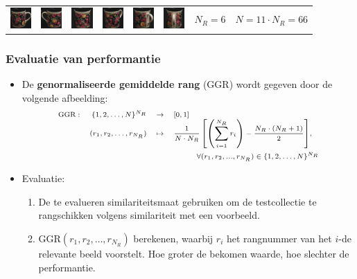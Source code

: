 \documentclass[dutch]{beamer}
\theoremstyle{definition}
\theoremstyle{remark}
\theoremstyle{example}
\begin{document}
{\begin{center}
\begin{tabular}{c@{\ }c@{}c@{}c@{}c@{}c c@{\ }c@{}c@{}c@{}c@{}c}
\includegraphics[width=0.8cm]{coil/beeld-60.eps} &
\includegraphics[width=0.8cm]{coil/beeld-61.eps} &
\includegraphics[width=0.8cm]{coil/beeld-62.eps} &
\includegraphics[width=0.8cm]{coil/beeld-63.eps} &
\includegraphics[width=0.8cm]{coil/beeld-64.eps} &
\includegraphics[width=0.8cm]{coil/beeld-65.eps} &
\multicolumn{2}{c}{$N_R = 6$} & 
\multicolumn{4}{c}{$N = 11 \cdot N_R = 66$}

\end{tabular}
\end{center}

}
\frame
{
  \frametitle{Evaluatie van performantie}

  \begin{itemize}
  \item De \textbf{genormaliseerde gemiddelde rang} (GGR) wordt gegeven door de volgende afbeelding:
  \begin{displaymath}
  \scriptsize\begin{array}{lrcl}
  \text{GGR}: & \{1,2,\ldots,N\}^{N_R} & \to 	& [0,1] \\
		& (r_1,r_2,\ldots,r_{N_R}) & \mapsto &
	{\displaystyle\frac{1}{N \cdot N_R}\left[ \left(\sum_{i=1}^{N_R}r_i\right) - \frac{N_R \cdot (N_R + 1)}{2} \right]},\\[15pt]
	& & & \qquad \quad \forall (r_1, r_2, ..., r_{N_R}) \in \{1,2,\ldots,N\}^{N_R}
  \end{array}
  \end{displaymath}
  \item Evaluatie:
  \begin{enumerate}
    \item De te evalueren similariteitsmaat gebruiken om de testcollectie te rangschikken 
    volgens similariteit met een voorbeeld. 
    \item $\text{GGR}(r_1,r_2,\ldots,r_{N_R})$ berekenen, waarbij $r_i$ het rangnummer 
    van het $i$-de relevante beeld voorstelt. Hoe groter de bekomen waarde, hoe 
    slechter de performantie.
  \end{enumerate}
  \end{itemize}
}
\end{document}
